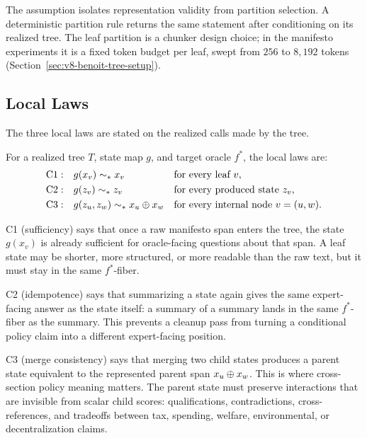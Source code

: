 The assumption isolates representation validity from partition
selection. A deterministic partition rule returns the same statement
after conditioning on its realized tree. The leaf partition is a
chunker design choice; in the manifesto experiments it is a fixed
token budget per leaf, swept from \(256\) to \(8{,}192\) tokens
(Section~\ref{sec:v8-benoit-tree-setup}).

\subsection{Local Laws}

The three local laws are stated on the realized calls made by the tree.

\begin{definition}\label{def:v8-local-laws}
For a realized tree \(T\), state map \(g\), and target oracle \(f^\ast\), the
local laws are:
\[
\begin{aligned}
\mathrm{C1:}\quad&
g(x_v)\sim_\ast x_v
&&\text{for every leaf }v,\\
\mathrm{C2:}\quad&
g(z_v)\sim_\ast z_v
&&\text{for every produced state }z_v,\\
\mathrm{C3:}\quad&
g(z_u,z_w)\sim_\ast x_u\oplus x_w
&&\text{for every internal node }v=(u,w).
\end{aligned}
\]
\end{definition}

C1 (sufficiency) says that once a raw manifesto span enters the tree,
the state \(g(x_v)\) is already sufficient for oracle-facing questions
about that span. A leaf state may be shorter, more structured, or
more readable than the raw text, but it must stay in the same
\(f^\ast\)-fiber.

C2 (idempotence) says that summarizing a state again gives the same
expert-facing answer as the state itself: a summary of a summary
lands in the same \(f^\ast\)-fiber as the summary. This prevents a
cleanup pass from turning a conditional policy claim into a different
expert-facing position.

C3 (merge consistency) says that merging two child states produces a
parent state equivalent to the represented parent span
\(x_u\oplus x_w\). This is where cross-section policy meaning
matters. The parent state must preserve interactions that are
invisible from scalar child scores: qualifications, contradictions,
cross-references, and tradeoffs between tax, spending, welfare,
environmental, or decentralization claims.

